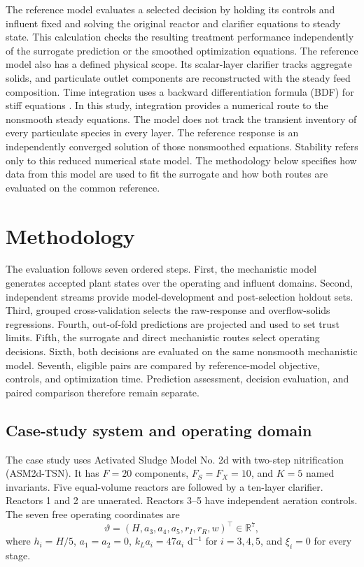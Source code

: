 \documentclass[a4paper,fleqn]{cas-sc}
\newcommand{\R}{\mathbb{R}}
\begin{document}
The reference model evaluates a selected decision by holding its controls and influent fixed and solving the original reactor and clarifier equations to steady state. This calculation checks the resulting treatment performance independently of the surrogate prediction or the smoothed optimization equations. The reference model also has a defined physical scope. Its scalar-layer clarifier tracks aggregate solids, and particulate outlet components are reconstructed with the steady feed composition. Time integration uses a backward differentiation formula (BDF) for stiff equations \citep{CurtissHirschfelder1952}. In this study, integration provides a numerical route to the nonsmooth steady equations. The model does not track the transient inventory of every particulate species in every layer. The reference response is an independently converged solution of those nonsmoothed equations. Stability refers only to this reduced numerical state model. The methodology below specifies how data from this model are used to fit the surrogate and how both routes are evaluated on the common reference.

\section{Methodology}

The evaluation follows seven ordered steps. First, the mechanistic model generates accepted plant states over the operating and influent domains. Second, independent streams provide model-development and post-selection holdout sets. Third, grouped cross-validation selects the raw-response and overflow-solids regressions. Fourth, out-of-fold predictions are projected and used to set trust limits. Fifth, the surrogate and direct mechanistic routes select operating decisions. Sixth, both decisions are evaluated on the same nonsmooth mechanistic model. Seventh, eligible pairs are compared by reference-model objective, controls, and optimization time. Prediction assessment, decision evaluation, and paired comparison therefore remain separate.



\subsection{Case-study system and operating domain}

The case study uses Activated Sludge Model No. 2d with two-step nitrification (ASM2d-TSN). It has $F=20$ components, $F_S=F_X=10$, and $K=5$ named invariants. Five equal-volume reactors are followed by a ten-layer clarifier. Reactors 1 and 2 are unaerated. Reactors 3--5 have independent aeration controls. The seven free operating coordinates are
\begin{equation}
\vartheta=(H,a_3,a_4,a_5,r_I,r_R,w)^\top\in\R^7,
\label{eq:casecontrols}
\end{equation}
where $h_i=H/5$, $a_1=a_2=0$, $k_La_i=47a_i$ d$^{-1}$ for $i=3,4,5$, and $\xi_i=0$ for every stage.
\end{document}
